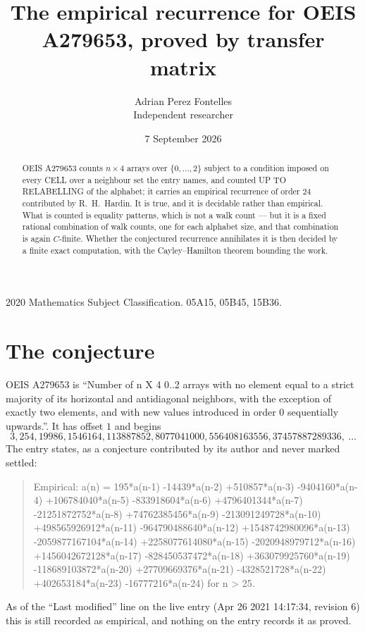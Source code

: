 \documentclass[11pt,a4paper]{article}
\title{The empirical recurrence for OEIS A279653, proved by transfer matrix}
\author{Adrian Perez Fontelles\\ \small Independent researcher}
\date{7 September 2026}
\theoremstyle{plain}
\theoremstyle{definition}
\begin{document}
\maketitle

\begin{abstract}
OEIS A279653 counts $n\times4$ arrays over $\{0,\dots,2\}$ subject to a condition imposed on
every CELL over a neighbour set the entry names, and counted UP TO RELABELLING of the
alphabet; it carries an empirical recurrence of order $24$ contributed by
R.~H.~Hardin. It is true, and it is decidable rather than empirical. What is counted is
equality patterns, which is not a walk count --- but it is a fixed rational combination of
walk counts, one for each alphabet size, and that combination is again $C$-finite. Whether the
conjectured recurrence annihilates it is then decided by a finite exact computation, with the
Cayley--Hamilton theorem bounding the work.
\end{abstract}

\noindent\small 2020 Mathematics Subject Classification. 05A15, 05B45, 15B36.\normalsize

\section{The conjecture}

OEIS A279653 is ``Number of n X 4 0..2 arrays with no element equal to a strict majority of its horizontal and antidiagonal neighbors, with the exception of exactly two elements, and with new values introduced in order 0 sequentially upwards.''. It has offset $1$ and begins
\[
3, 254, 19986, 1546164, 113887852, 8077041000, 556408163556, 37457887289336,\ \dots
\]
The entry states, as a conjecture contributed by its author and never marked settled:
\begin{quote}
Empirical: a(n) = 195*a(n-1) -14439*a(n-2) +510857*a(n-3) -9404160*a(n-4) +106784040*a(n-5) -833918604*a(n-6) +4796401344*a(n-7) -21251872752*a(n-8) +74762385456*a(n-9) -213091249728*a(n-10) +498565926912*a(n-11) -964790488640*a(n-12) +1548742980096*a(n-13) -2059877167104*a(n-14) +2258077614080*a(n-15) -2020948979712*a(n-16) +1456042672128*a(n-17) -828450537472*a(n-18) +363079925760*a(n-19) -118689103872*a(n-20) +27709669376*a(n-21) -4328521728*a(n-22) +402653184*a(n-23) -16777216*a(n-24) for n > 25.
\end{quote}
As of the ``Last modified'' line on the live entry (Apr 26 2021 14:17:34, revision 6) this is still
recorded as empirical, and nothing on the entry records it as proved.
\end{document}
